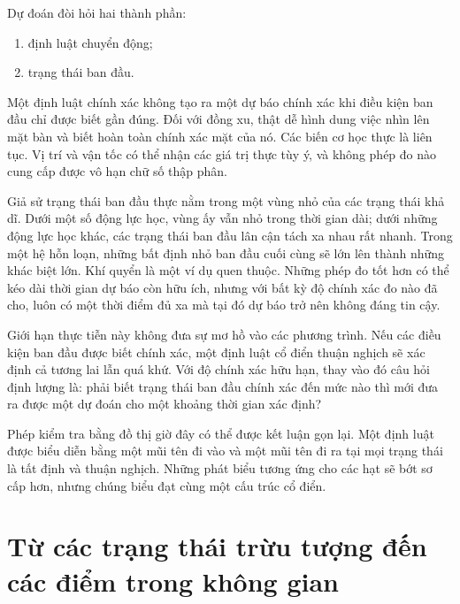 Dự đoán đòi hỏi hai thành phần:
\begin{enumerate}
  \item định luật chuyển động;
  \item trạng thái ban đầu.
\end{enumerate}
Một định luật chính xác không tạo ra một dự báo chính xác khi điều kiện ban đầu chỉ được biết gần đúng. Đối với đồng xu, thật dễ hình dung việc nhìn lên mặt bàn và biết hoàn toàn chính xác mặt của nó. Các biến cơ học thực là liên tục. Vị trí và vận tốc có thể nhận các giá trị thực tùy ý, và không phép đo nào cung cấp được vô hạn chữ số thập phân.

Giả sử trạng thái ban đầu thực nằm trong một vùng nhỏ của các trạng thái khả dĩ.
Dưới một số động lực học, vùng ấy vẫn nhỏ trong thời gian dài; dưới những động lực học khác, các trạng thái ban đầu lân cận tách xa nhau rất nhanh. Trong một hệ hỗn loạn, những bất định nhỏ ban đầu cuối cùng sẽ lớn lên thành những khác biệt lớn. Khí quyển là một ví dụ quen thuộc. Những phép đo tốt hơn có thể kéo dài thời gian dự báo còn hữu ích, nhưng với bất kỳ độ chính xác đo nào đã cho, luôn có một thời điểm đủ xa mà tại đó dự báo trở nên không đáng tin cậy.

Giới hạn thực tiễn này không đưa sự mơ hồ vào các phương trình.
Nếu các điều kiện ban đầu được biết chính xác, một định luật cổ điển thuận nghịch sẽ xác định cả tương lai lẫn quá khứ. Với độ chính xác hữu hạn, thay vào đó câu hỏi định lượng là: phải biết trạng thái ban đầu chính xác đến mức nào thì mới đưa ra được một dự đoán cho một khoảng thời gian xác định?

Phép kiểm tra bằng đồ thị giờ đây có thể được kết luận gọn lại. Một định luật được biểu diễn bằng một mũi tên đi vào và một mũi tên đi ra tại mọi trạng thái là tất định và thuận nghịch. Những phát biểu tương ứng cho các hạt sẽ bớt sơ cấp hơn, nhưng chúng biểu đạt cùng một cấu trúc cổ điển.

\section{Từ các trạng thái trừu tượng đến các điểm trong không gian}

